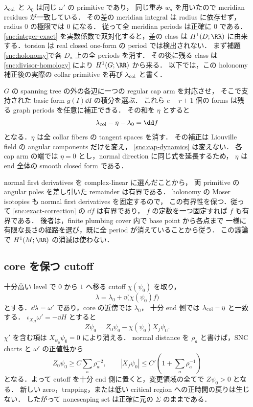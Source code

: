 $\lambda_{\rm col}$ と $\lambda_0$ は同じ $\omega'$ の primitive であり，
同じ重み $w_a$ を用いたので meridian residues が一致している．
その差の meridian integral は radius に依存せず，radius $0$ の極限では $0$ になる．
従って全 meridian periods は正確に $0$ である．
\eqref{snc:integer-exact} を実数係数で双対化すると，差の class は
$H^1(D;\RR)$ に由来する．torsion は real closed one-form の period では検出されない．
まず補題\ref{snc:holonomy}で各 $D_a$ 上の全 periods を消す．
その後に残る class は \eqref{snc:divisor-homology} により $H^1(G;\RR)$ から来る．
以下では，この holonomy 補正後の実際の collar primitive を再び
$\lambda_{\rm col}$ と書く．

$G$ の spanning tree の外の各辺に一つの regular cap arm を対応させ，
そこで支持された basic form $g(I)\dd I$ の積分を選ぶ．
これら $e-r+1$ 個の forms は残る graph periods を任意に補正できる．
その和を $\eta$ とすると
\begin{equation}\label{snc:exact-correction}
 \lambda_{\rm col}-\eta-\lambda_0=\dd f
\end{equation}
となる．$\eta$ は全 collar fibers の tangent spaces を消す．
その補正は Liouville field の angular components だけを変え，
\eqref{snc:cap-dynamics} は変えない．
各 cap arm の端では $\eta=0$ とし，normal direction に同じ式を延長するため，
$\eta$ は end 全体の smooth closed form である．

normal first derivatives を complex-linear に選んだことから，
両 primitive の angular poles を差し引いた remainder は有界である．
holonomy の Moser isotopies も normal first derivatives を固定するので，
この有界性を保つ．従って \eqref{snc:exact-correction} の $\dd f$ は有界であり，
$f$ の定数を一つ固定すれば $f$ も有界である．
後者は，finite plumbing cover 内で base point から各点まで
一様に有限な長さの経路を選び，既に全 period が消えていることから従う．
この議論で $H^1(M;\RR)$ の消滅は使わない．

\subsection{core を保つ cutoff}

十分高い level で $0$ から $1$ へ移る cutoff $\chi(\psi_0)$ を取り，
\[
 \lambda=\lambda_0+\dd\bigl(\chi(\psi_0)f\bigr)
\]
とする．$\dd\lambda=\omega'$ であり，core の近傍では $\lambda_0$，
十分 end 側では $\lambda_{\rm col}-\eta$ と一致する．
$\iota_{X_H}\omega'=-\dd H$ とすると
\begin{equation}\label{snc:cutoff-estimate}
 Z\psi_0=Z_0\psi_0-\chi(\psi_0)X_f\psi_0.
\end{equation}
$\chi'$ を含む項は $X_{\psi_0}\psi_0=0$ により消える．
normal distance を $\rho_a$ と書けば，SNC charts と $\omega'$ の正値性から
\[
 Z_0\psi_0\geq C\sum_a\rho_a^{-2},\qquad
 |X_f\psi_0|\leq C'\left(1+\sum_a\rho_a^{-1}\right)
\]
となる．よって cutoff を十分 end 側に置くと，変更領域の全てで $Z\psi_0>0$ となる．
新しい zero，trapping，または低い critical region への正時間の戻りは生じない．
したがって nonescaping set は正確に元の $\Sigma$ のままである．

